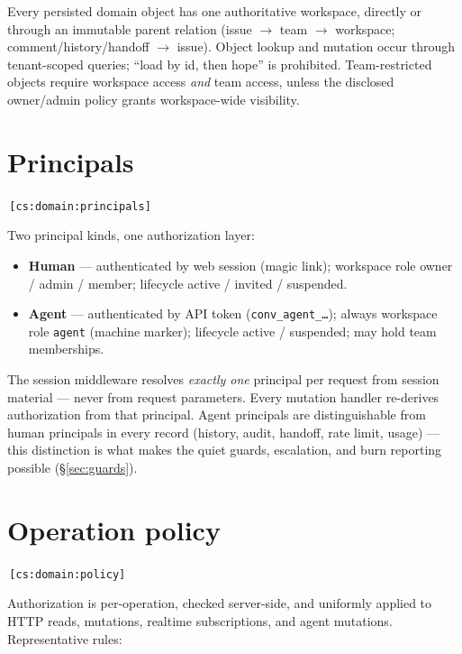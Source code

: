 \documentclass[11pt,a4paper]{report}
\newcommand{\cs}[1]{\,\texttt{\scriptsize[cs:#1]}\label{cs:#1}}
\begin{document}
Every persisted domain object has one authoritative workspace, directly
or through an immutable parent relation (issue $\to$ team $\to$
workspace; comment/history/handoff $\to$ issue). Object lookup and
mutation occur through tenant-scoped queries; ``load by id, then hope''
is prohibited. Team-restricted objects require workspace access
\emph{and} team access, unless the disclosed owner/admin policy grants
workspace-wide visibility.

\section{Principals}
\cs{domain:principals}

Two principal kinds, one authorization layer:

\begin{itemize}
\item \textbf{Human} --- authenticated by web session (magic link);
  workspace role owner / admin / member; lifecycle
  active / invited / suspended.
\item \textbf{Agent} --- authenticated by API token
  (\texttt{conv\_agent\_…}); always workspace role \texttt{agent}
  (machine marker); lifecycle active / suspended; may hold team
  memberships.
\end{itemize}

The session middleware resolves \emph{exactly one} principal per request
from session material --- never from request parameters. Every mutation
handler re-derives authorization from that principal. Agent principals
are distinguishable from human principals in every record (history,
audit, handoff, rate limit, usage) --- this distinction is what makes the
quiet guards, escalation, and burn reporting possible
(\S\ref{sec:guards}).

\section{Operation policy}
\cs{domain:policy}

Authorization is per-operation, checked server-side, and uniformly
applied to HTTP reads, mutations, realtime subscriptions, and agent
mutations. Representative rules:
\end{document}
